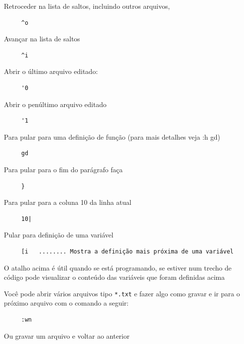\documentclass[10pt,a4paper,openany]{book}
\begin{document}
Retroceder na lista de saltos, incluindo outros arquivos,

\begin{verbatim}
     ^o
\end{verbatim}

Avançar na lista de saltos

\begin{verbatim}
     ^i
\end{verbatim}

Abrir o último arquivo editado:

\begin{verbatim}
     '0
\end{verbatim}

Abrir o penúltimo arquivo editado

\begin{verbatim}
     '1
\end{verbatim}

Para pular para uma definição de função (para mais detalhes veja :h gd)

\begin{verbatim}
     gd
\end{verbatim}

Para pular para o fim do parágrafo faça

\begin{verbatim}
     }
\end{verbatim}

Para pular para a coluna 10 da linha atual

\begin{verbatim}
     10|
\end{verbatim}

Pular para definição de uma variável

\begin{verbatim}
     [i   ........ Mostra a definição mais próxima de uma variável
\end{verbatim}

O atalho acima é útil quando se está programando, se estiver num
trecho de código pode visualizar o conteúdo das variáveis que foram
definidas acima

Você pode abrir vários arquivos tipo \verb|*.txt| e fazer
algo como gravar e ir para o próximo arquivo com o comando a
seguir:

\begin{verbatim}
     :wn
\end{verbatim}

Ou gravar um arquivo e voltar ao anterior
\end{document}

